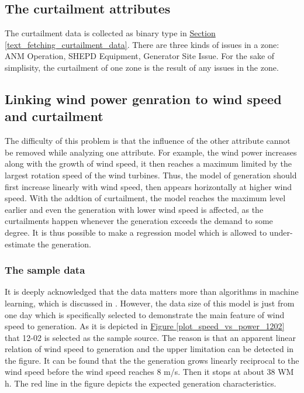 \documentclass[12pt,a4paper]{report}
\begin{document}
                \subsection{The curtailment attributes}
                The curtailment data is collected as binary type in \hyperref[text_fetching_curtailment_data]{Section \ref*{text_fetching_curtailment_data}}. There are three kinds of issues in a zone: ANM Operation, SHEPD Equipment, Generator Site Issue. For the sake of simplisity, the curtailment of one zone is the result of any issues in the zone.

                \subsection{Linking wind power genration to wind speed and curtailment}
                The difficulty of this problem is that the influence of the other attribute cannot be removed while analyzing one attribute. For example, the wind power increases along with the growth of wind speed, it then reaches a maximum limited by the largest rotation speed of the wind turbines. Thus, the model of generation should first increase linearly with wind speed, then appears horizontally at higher wind speed. With the addtion of curtailment, the model reaches the maximum level earlier and even the generation with lower wind speed is affected, as the curtailments happen whenever the generation exceeds the demand to some degree.
                It is thus possible to make a regression model which is allowed to under-estimate the generation.
                \label{text_wind_regression_model}
                    \subsubsection{The sample data}
                    It is deeply acknowledged that the data matters more than algorithms in machine learning, which is discussed in \cite{paper:datasize}. However, the data size of this model is just from one day which is specifically selected to demonstrate the main feature of wind speed to generation.
                    As it is depicted in \hyperref[plot_speed_vs_power_1202]{Figure \ref*{plot_speed_vs_power_1202}} that 12-02 is selected as the sample source. The reason is that an apparent linear relation of wind speed to generation and the upper limitation can be detected in the figure.
                    It can be found that the the generation grows linearly reciprocal to the wind speed before the wind speed reaches 8 m/s. Then it stops at about 38 WM h. The red line in the figure depicts the expected generation characteristics.
\end{document}
